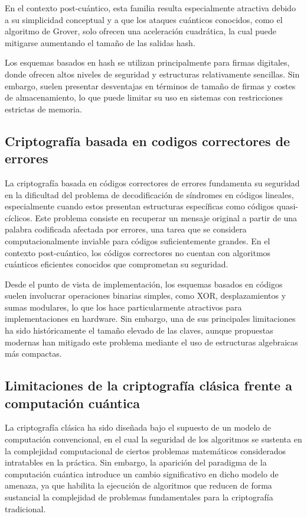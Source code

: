 En el contexto post-cuántico, esta familia resulta especialmente atractiva debido a su simplicidad conceptual y a que los ataques cuánticos conocidos, como el algoritmo de Grover, solo ofrecen una aceleración cuadrática, la cual puede mitigarse aumentando el tamaño de las salidas hash.

Los esquemas basados en hash se utilizan principalmente para firmas digitales, donde ofrecen altos niveles de seguridad y estructuras relativamente sencillas. Sin embargo, suelen presentar desventajas en términos de tamaño de firmas y costes de almacenamiento, lo que puede limitar su uso en sistemas con restricciones estrictas de memoria.

\subsection{Criptografía basada en codigos correctores de errores}
La criptografía basada en códigos correctores de errores fundamenta su seguridad en la dificultad del problema de decodificación de síndromes en códigos lineales, especialmente cuando estos presentan estructuras específicas como códigos quasi-cíclicos. Este problema consiste en recuperar un mensaje original a partir de una palabra codificada afectada por errores, una tarea que se considera computacionalmente inviable para códigos suficientemente grandes. En el contexto post-cuántico, los códigos correctores no cuentan con algoritmos cuánticos eficientes conocidos que comprometan su seguridad.

Desde el punto de vista de implementación, los esquemas basados en códigos suelen involucrar operaciones binarias simples, como XOR, desplazamientos y sumas modulares, lo que los hace particularmente atractivos para implementaciones en hardware. Sin embargo, una de sus principales limitaciones ha sido históricamente el tamaño elevado de las claves, aunque propuestas modernas han mitigado este problema mediante el uso de estructuras algebraicas más compactas.

\subsection{Limitaciones de la criptografía clásica frente a computación cuántica}
La criptografía clásica ha sido diseñada bajo el supuesto de un modelo de computación convencional, en el cual la seguridad de los algoritmos se sustenta en la complejidad computacional de ciertos problemas matemáticos considerados intratables en la práctica. Sin embargo, la aparición del paradigma de la computación cuántica introduce un cambio significativo en dicho modelo de amenaza, ya que habilita la ejecución de algoritmos que reducen de forma sustancial la complejidad de problemas fundamentales para la criptografía tradicional.

